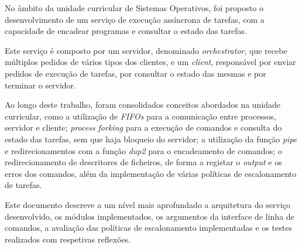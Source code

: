 \documentclass[a4paper,11pt]{scrreprt}
\begin{document}



\makecover



\renewenvironment{abstract}
 {\par\noindent\textbf{\Large\abstractname}\par\bigskip}
 {}

\begin{flushleft}
\begin{abstract}
    No âmbito da unidade curricular de Sistemas Operativos,
    foi proposto o desenvolvimento de um serviço de execução assíncrona de tarefas,
    com a capacidade de encadear programas e consultar o estado das tarefas.

    Este serviço é composto por um servidor, denominado \textit{orchestrator},
    que recebe múltiplos pedidos de vários tipos dos clientes, e um \textit{client}, responsável
    por enviar pedidos de execução de tarefas, por consultar o estado das mesmas e por terminar o servidor.

    Ao longo deste trabalho, foram consolidados conceitos abordados na unidade curricular,
    como a utilização de \textit{FIFOs} para a comunicação entre processos, servidor e cliente;
    \textit{process forking} para a execução de comandos e consulta do estado das tarefas,
    sem que haja bloqueio do servidor;
    a utilização da função \textit{pipe} e redirecionamentos com a função \textit{dup2} para o encadeamento de comandos;
    o redirecionamento de descritores de ficheiros, de forma a registar o \textit{output} e os erros dos comandos,
    além da implementação de várias políticas de escalonamento de tarefas.

    Este documento descreve a um nível mais aprofundado a arquitetura do serviço desenvolvido,
    os módulos implementados, os argumentos da interface de linha de comandos, a avaliação das
    políticas de escalonamento implementadas e os testes realizados com respetivas reflexões.
\end{abstract}
\end{flushleft}
\end{document}
